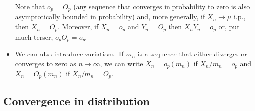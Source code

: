 \begin{itemize}[leftmargin=0pt]
  Note that $o_p = O_p$ (any sequence that converges in probability to
  zero is also asymptotically bounded in probability) and, more
  generally, if $X_n \to \mu$ i.p., then $X_n = O_p$.  Moreover, if $X_n =
  o_p$ and $Y_n = O_p$ then $X_n Y_n = o_p$ or, put much terser, $o_p
  O_p = o_p$.

\item We can also introduce variations.  If $m_n$ is a sequence that
  either diverges or converges to zero as $n \to \infty$, we can write $X_n =
  o_p(m_n)$ if $X_n / m_n = o_p$ and $X_n = O_p(m_n)$ if $X_n / m_n =
  O_p$.
\end{itemize}

\subsection{Convergence in distribution}

